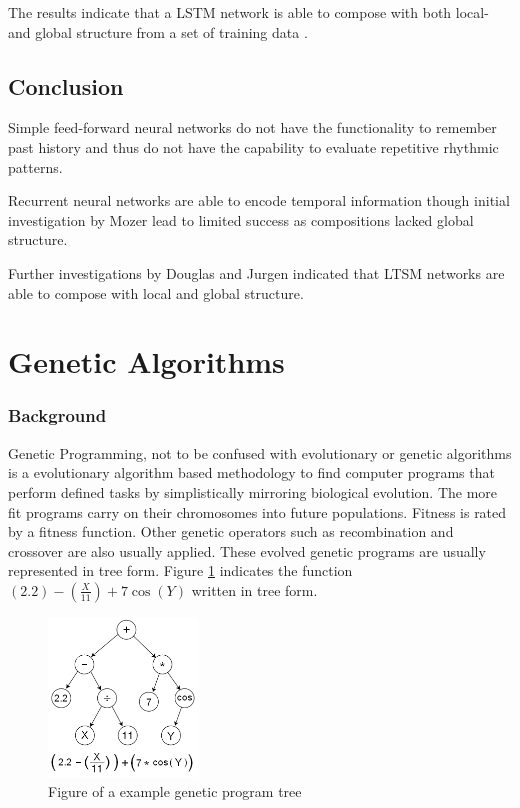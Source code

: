 The results indicate that a \ac{LSTM} network is able to compose with both local- and global structure from a set of training data \cite{Eck2002}.


\subsection{Conclusion}

Simple feed-forward neural networks do not have the functionality to remember past history and thus do not have the capability to evaluate repetitive rhythmic patterns.

Recurrent neural networks are able to encode temporal information though initial investigation by Mozer lead to limited success as compositions lacked global structure. 

Further investigations by Douglas and Jurgen indicated that \ac{LTSM} networks are able to compose with local and global structure.

\section{Genetic Algorithms}
\subsubsection{Background}

Genetic Programming, not to be confused with evolutionary or genetic algorithms is a evolutionary algorithm based methodology to find computer programs that perform defined tasks by simplistically mirroring biological evolution.
The more fit programs carry on their chromosomes into future populations. Fitness is rated by a fitness function. Other genetic operators such as recombination and crossover are also usually applied. 
These evolved genetic programs are usually represented in tree form. Figure \ref{ims:gpt} indicates the function $ (2.2) - (\frac{X}{11}) + 7\cos(Y)$ written in tree form.
\begin{figure}[!bh]
\centerline{\includegraphics[width=150px]{../images/gpt.png}}
\caption{Figure of a example genetic program tree}
\label{ims:gpt}
\end{figure}

